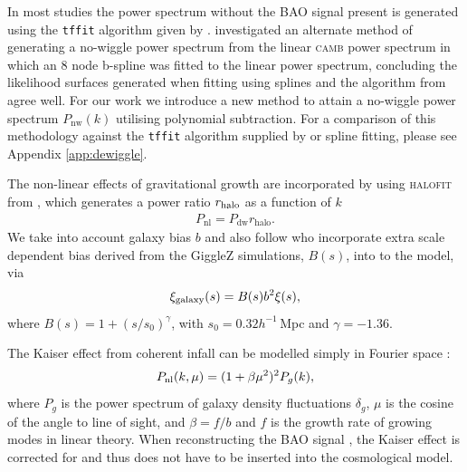 \documentclass[a4paper,fleqn,usenatbib]{mnras}
\newcommand{\camb}{\textsc{camb}}
\newcommand{\halofit}{\textsc{halofit}}
\begin{document}
In most studies the power spectrum without the BAO signal present is generated using the \verb;tffit; algorithm given by \citet{EisensteinHu1998}. \citet{ReidPercival2010} investigated an alternate method of generating a no-wiggle power spectrum from the linear \camb{} power spectrum in which an 8 node b-spline was fitted to the linear power spectrum, concluding the likelihood surfaces generated when fitting using splines and the algorithm from \citet{EisensteinHu1998} agree well. For our work we introduce a new method to attain a no-wiggle power spectrum $P_{\mathrm{nw}}(k)$ utilising polynomial subtraction. For a comparison of this methodology against the \verb;tffit; algorithm supplied by \citet{EisensteinHu1998} or spline fitting, please see Appendix \ref{app:dewiggle}.


The non-linear effects of gravitational growth are incorporated by using \halofit{} from \citet{Smith2003}, which generates a power ratio $r_{\rm{halo}}$ as a function of $k$ 
\begin{align}
	P_{\text{nl}} = P_{\text{dw}} r_{\text{halo}}.
\end{align}
We take into account galaxy bias $b$ and also follow \citet{BlakeDavis2011} who incorporate extra scale dependent bias derived from the GiggleZ simulations, $B(s)$, into to the model, via
\begin{align}
	\xi_{\rm{galaxy}}(s) = B(s) b^2 \xi(s),
\end{align}
where $B(s) = 1 + (s/s_0)^\gamma$, with $s_0 = 0.32 h^{-1}\,$Mpc and $\gamma = -1.36$.




The Kaiser effect from coherent infall can be modelled simply in Fourier space \citep{Kaiser1987}:
\begin{align} \label{eq:gaztanga1}
	P_{\rm{nl}}(k, \mu) = (1 + \beta \mu^2)^2 P_{g}(k),
\end{align}
where $P_{g}$ is the power spectrum of galaxy density fluctuations $\delta_g$, $\mu$ is the cosine of the angle to line of sight, and $\beta = f/b$ and $f$ is the growth rate of growing modes in linear theory. When reconstructing the BAO signal \citep[see][for details]{PadmanabhanXuEisenstein2012,KazinKoda2014}, the Kaiser effect is corrected for and thus does not have to be inserted into the cosmological model.
\end{document}
